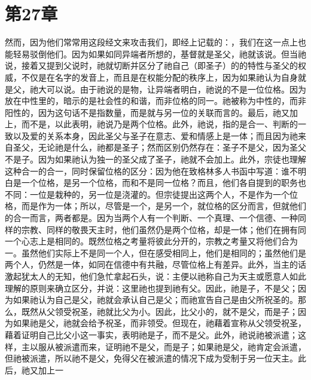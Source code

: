 
\section{第27章}

\par

然而，因为他们常常用这段经文来攻击我们，即经上记载的：，我们在这一点上也能轻易驳倒他们。因为如果如同异端者所想的，基督就是圣父，祂就该说。但当祂说，接着又提到父说时，祂就切断并区分了祂自己（即圣子）的的特性与圣父的权威，不仅是在名字的发音上，而且是在权能分配的秩序上，因为如果祂认为自身就是父，祂大可以说。由于祂说的是物，让异端者明白，祂说的不是一位位格。因为放在中性里的，暗示的是社会性的和谐，而非位格的同一。祂被称为中性的，而非阳性的，因为这句话不是指数量，而是就与另一位的关联而言的。最后，祂又加上，而不是，以此表明，祂说乃是两个位格。此外，祂说，指的是合一、判断的一致以及爱的关系本身，因此圣父与圣子在意志、爱和情感上是一体；而且因为祂来自圣父，无论祂是什么，祂都是圣子；然而区别仍然存在：圣子不是父，因为圣父不是子。因为如果祂认为独一的圣父成了圣子，祂就不会加上。此外，宗徒也理解这种合一的合一，同时保留位格的区分：因为他在致格林多人书函中写道：谁不明白是一个位格，是另一个位格，而和不是同一位格？而且，他们各自提到的职务也不同：一位是栽种的，另一位是浇灌的。但宗徒提出这两个人，不是作为一个位格，而是作为一体；所以，尽管是一个，是另一个，就位格的区分而言，但就他们的合一而言，两者都是。因为当两个人有一个判断、一个真理、一个信德、一种同样的宗教、同样的敬畏天主时，他们虽然仍是两个位格，却是一体；他们在拥有同一个心志上是相同的。既然位格之考量将彼此分开的，宗教之考量又将他们合为一。虽然他们实际上不是同一个人，但在感受相同上，他们是相同的；虽然他们是两个人，仍然是一体，如同在信德中有共融，尽管位格上有差异。此外，当主的话激起犹太人的无知，他们急忙拿起石头，说：主便以祂称自己为天主或愿意人如此理解的原则来确立区分，并说：这里祂也提到祂有父。因此，祂是子，不是父；因为如果祂认为自己是父，祂就会承认自己是父；而祂宣告自己是由父所祝圣的。那么，既然从父领受祝圣，祂就比父为小。因此，比父小的，就不是父，而是子；因为如果祂是父，祂就会给予祝圣，而非领受。但现在，祂藉着宣称从父领受祝圣，藉着证明自己比父小这一事实，表明祂是子，而不是父。此外，祂说祂被派遣；这样，主以服从被派遣而来，证明祂不是父，而是子；如果祂是父，祂肯定会派遣，但祂被派遣，所以祂不是父，免得父在被派遣的情况下成为受制于另一位天主。此后，祂又加上一